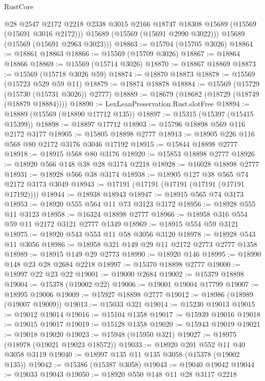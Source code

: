 \begin{lexlean}{RustCore}
\begin{coremodule}
          @28
          @2547
          @2172
          @2218
          @2338
          @3015
          @2166
          @18747
          @18308
          @15689
          (@15569 (@15691 @3016 @2172)))
        @15689
        (@15569 (@15691 @2990 @3022)))
      @15689
      (@15569 (@15691 @2963 @3023)))
@18863 := @15704 (@15705 @3026)
@18864 := @18861 @18863
@18866 := @15569 (@15709 @3026)
@18867 := @18864 @18866
@18869 := @15569 (@15714 @3026)
@18870 := @18867 @18869
@18873 := @15569 (@15718 @3026 @59)
@18874 := @18870 @18873
@18878 := @15569 (@15723 @529 @59 @11)
@18879 := @18874 @18878
@18884 := @15569 (@15729 (@15730 (@15731 @3026)) @2777)
@18889 := @18679 (@18682 (@18729 (@18749 (@18879 @18884))))
@18890 := LexLeanPreservation.Rust.slotFree
@18894 := @18889 (@15569 (@18890 @17712 @135))
@18897 := @15315 (@15397 (@15415 @15399))
@18898 := @18897 @17712
@18903 := @15796 @18898 @569 @116 @2172 @3177
@18905 := @15805 @18898 @2777
@18913 := @18905 @226 @116 @568 @80 @2172 @3176 @3046 @17192
@18915 := @15844 @18898 @2777
@18918 := @18915 @568 @80 @3176
@18920 := @15853 @18898 @2777
@18926 := @18920 @566 @148 @38 @28 @3174 @2218
@18928 := @16028 @18898 @2777
@18931 := @18928 @566 @38 @3174
@18938 := @18905 @127 @38 @565 @74 @2172 @3173 @3049
@18943 := @17191 (@17191 (@17191 (@17191 (@17191 @17192))))
@18944 := @18938 @18943
@18947 := @18915 @565 @74 @3173
@18953 := @18920 @555 @564 @11 @73 @3123 @3172
@18956 := @18928 @555 @11 @3123
@18958 := @16324 @18898 @2777
@18966 := @18958 @316 @554 @59 @11 @2172 @3121 @2777 @1349
@18969 := @18915 @554 @59 @3121
@18975 := @18920 @543 @553 @11 @58 @3056 @3120
@18978 := @18928 @543 @11 @3056
@18986 := @18958 @321 @149 @29 @11 @2172 @2773 @2777 @1358
@18989 := @18915 @149 @29 @2773
@18990 := @18920 @146
@18995 := @18990 @148 @23 @28 @2684 @2218
@18997 := @15370 @18898 @2777
@19000 := @18997 @22 @23 @22
@19001 := @19000 @2684
@19002 := @15379 @18898
@19004 := @15378 (@19002 @22)
@19006 := @19001 @19004 @17799
@19007 := @18995 @19006
@19009 := @15927 @18898 @2777
@19012 := @18986 (@18989 (@19007 @19009))
@19013 := @15033 @321
@19014 := @15230 @19013
@19015 := @19012 @19014
@19016 := @15104 @1358
@19017 := @15939 @19016
@19018 := @19015 @19017
@19019 := @15128 @1358
@19020 := @15943 @19019
@19021 := @19018 @19020
@19023 := @15948 (@15950 @321)
@19027 := @18975 (@18978 (@19021 @19023 @18572))
@19033 := @18920 @201 @552 @11 @40 @3058 @3119
@19040 := @18997 @135 @11 @135 @3058 (@15378 (@19002 @135))
@19042 := @15386 (@15387 @3058)
@19043 := @19040 @19042
@19044 := @19033 @19043
@19050 := @18920 @550 @148 @11 @28 @3117 @2218

\end{coremodule}
\end{lexlean}
